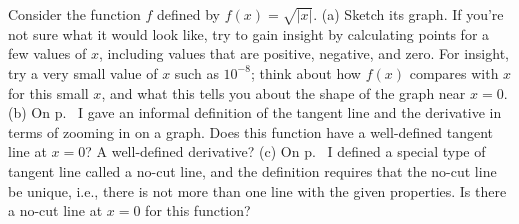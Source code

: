 Consider the function $f$ defined by $f(x)=\sqrt{|x|}$.\hwendpart
(a) Sketch its graph. If you're not sure what it would look like, try to gain
insight by calculating points for a few values of $x$, including values that
are positive, negative, and zero. For insight, try a very small
value of $x$ such as $10^{-8}$; think about how $f(x)$
 compares with $x$ for this small $x$, and what this tells you about the shape of the graph near $x=0$.\hwendpart
(b) On p.~\pageref{tangent-line-informal} I gave an informal definition of the
tangent line and the derivative in terms of zooming in on a graph. Does
this function have a well-defined tangent line at $x=0$? A well-defined
derivative?\hwendpart
(c) On p.~\pageref{no-cut} I defined a special type of tangent line called
a no-cut line, and the definition requires that the no-cut line be unique,
i.e., there is not more than one line with the given properties. Is there a no-cut line at $x=0$
for this function?
